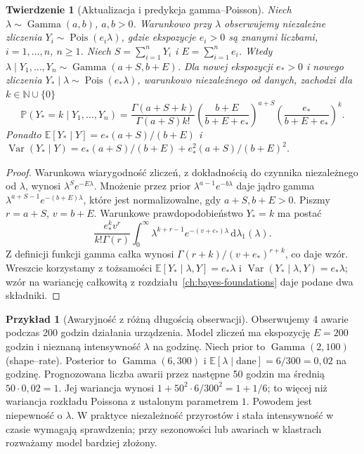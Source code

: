 \documentclass[11pt,a4paper,oneside]{report}
\numberwithin{equation}{chapter}
\theoremstyle{plain}
\newtheorem{twierdzenie}{Twierdzenie}[chapter]
\theoremstyle{definition}
\newtheorem{przyklad}{Przykład}[chapter]
\theoremstyle{remark}
\newcommand{\N}{\mathbb N}
\newcommand{\Prob}{\mathbb P}
\newcommand{\E}{\mathbb E}
\newcommand{\Var}{\operatorname{Var}}
\newcommand{\dd}{\mathrm d}
\begin{document}
\begin{twierdzenie}[Aktualizacja i predykcja gamma--Poisson]
\label{thm:gamma-poisson}
Niech $\lambda\sim\operatorname{Gamma}(a,b)$,
$a,b>0$. Warunkowo przy $\lambda$ obserwujemy niezależne
zliczenia $Y_i\sim\operatorname{Pois}(e_i\lambda)$,
gdzie ekspozycje $e_i>0$ są znanymi liczbami,
$i=1,\ldots,n$, $n\ge1$. Niech $S=\sum_{i=1}^nY_i$
i $E=\sum_{i=1}^ne_i$. Wtedy
$\lambda\mid Y_1,\ldots,Y_n\sim\operatorname{Gamma}(a+S,b+E)$.
Dla nowej ekspozycji $e_*>0$ i nowego zliczenia
$Y_*\mid\lambda\sim\operatorname{Pois}(e_*\lambda)$,
warunkowo niezależnego od danych, zachodzi dla $k\in\N\cup\{0\}$
\[
 \Prob(Y_*=k\mid Y_1,\ldots,Y_n)
 =\frac{\Gamma(a+S+k)}{\Gamma(a+S)k!}
 \left(\frac{b+E}{b+E+e_*}\right)^{a+S}
 \left(\frac{e_*}{b+E+e_*}\right)^k.
\]
Ponadto $\E[Y_*\mid Y]=e_*(a+S)/(b+E)$ i
$\Var(Y_*\mid Y)=e_*(a+S)/(b+E)
+e_*^2(a+S)/(b+E)^2$.
\end{twierdzenie}
\begin{proof}
Warunkowa wiarygodność zliczeń, z dokładnością do
czynnika niezależnego od $\lambda$, wynosi
$\lambda^Se^{-E\lambda}$. Mnożenie przez prior
$\lambda^{a-1}e^{-b\lambda}$ daje jądro gamma
$\lambda^{a+S-1}e^{-(b+E)\lambda}$, które jest
normalizowalne, gdy $a+S,b+E>0$.
Piszmy $r=a+S$, $v=b+E$. Warunkowe prawdopodobieństwo
$Y_*=k$ ma postać
\[
 \frac{e_*^kv^r}{k!\Gamma(r)}
 \int_0^\infty\lambda^{k+r-1}
 e^{-(v+e_*)\lambda}\,\dd\lambda_1(\lambda).
\]
Z definicji funkcji gamma całka wynosi
$\Gamma(r+k)/(v+e_*)^{r+k}$, co daje wzór.
Wreszcie korzystamy z tożsamości
$\E[Y_*\mid\lambda,Y]=e_*\lambda$ i
$\Var(Y_*\mid\lambda,Y)=e_*\lambda$;
wzór na wariancję całkowitą z rozdziału~\ref{ch:bayes-foundations}
daje podane dwa składniki.
\end{proof}

\begin{przyklad}[Awaryjność z różną długością obserwacji]
Obserwujemy 4 awarie podczas 200 godzin działania urządzenia.
Model zliczeń ma ekspozycję $E=200$ godzin i nieznaną
intensywność $\lambda$ na godzinę. Niech prior to
$\operatorname{Gamma}(2,100)$ (shape--rate).
Posterior to $\operatorname{Gamma}(6,300)$ i
$\E[\lambda\mid\mathrm{dane}]=6/300=0{,}02$ na godzinę.
Prognozowana liczba awarii przez następne 50 godzin ma średnią
$50\cdot0{,}02=1$. Jej wariancja wynosi
$1+50^2\cdot 6/300^2=1+1/6$; to więcej niż
wariancja rozkładu Poissona z ustalonym parametrem $1$.
Powodem jest niepewność o $\lambda$.
W praktyce niezależność przyrostów i stała intensywność
w czasie wymagają sprawdzenia; przy sezonowości lub awariach
w klastrach rozważamy model bardziej złożony.
\end{przyklad}
\end{document}
